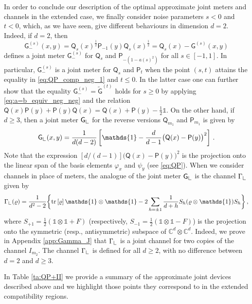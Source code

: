 \documentclass[12pt,reqno]{amsart}
\theoremstyle{definition}
\newcommand{\tr}[1]{{\rm tr}\left[#1\right]} %
\newcommand{\id}{\mathds{1}} %
\newcommand{\Qo}{\mathsf{Q}}%
\newcommand{\Po}{\mathsf{P}}%
\newcommand{\Go}{\mathsf{G}}%
\newcommand{\Lcorner}{{\mathchoice{\mathrel{\makebox[7pt][c]{\rule{.4pt}{7.5pt}\rule{5pt}{.4pt}}}}{\mathrel{\makebox[7pt][c]{\rule{.4pt}{7.5pt}\rule{5pt}{.4pt}}}}{\mathrel{\makebox[5.5pt][c]{\rule{.4pt}{5.25pt}\rule{3.5pt}{.4pt}}}}{\mathrel{\makebox[4pt][c]{\rule{.4pt}{3.75pt}\rule{2.5pt}{.4pt}}}}}}
\newcommand{\rhoo}{\varrho} %
\newcommand{\phii}{\varphi} %
\newcommand{\Cb}{\mathbb{C}} %
\begin{document}
In order to conclude our description of the optimal approximate joint meters and channels in the extended case, we finally consider noise parameters $s<0$ and $t<0$, which, as we have seen, give different behaviours in dimension $d=2$. Indeed, if $d=2$, then
\begin{equation}\label{eq:Gominus}
\Go^{(s)}_-(x,y) = \Qo_s(x)^{\frac{1}{2}}\Po_{-1}(y)\Qo_s(x)^{\frac{1}{2}} = \Qo_s(x) - \Go^{(s)}(x,y)
\end{equation}
defines a joint meter $\Go^{(s)}_-$ for $\Qo_s$ and $\Po_{-(1-a(s)^2)}$ for all $s\in [-1,1]$. In particular, $\Go^{(s)}_-$ is a joint meter for $\Qo_s$ and $\Po_t$ when the point $(s,t)$ attains the equality in \eqref{eq:QP_comp_neg_1} and $t\leq 0$. In the latter case one can further show that the equality $\Go^{(s)}_- = \tilde{\Go}^{(t)}$ holds for $s\geq 0$ by applying \eqref{eq:a=b_equiv_neg_neg} and the relation $\Qo(x)\Po(y) + \Po(y)\Qo(x) = \Qo(x) + \Po(y) - \frac{1}{2}\id$. On the other hand, if $d\geq 3$, then a joint meter $\Go_\Lcorner$ for the reverse versions $\Qo_{m_1}$ and $\Po_{m_1}$ is given by
\begin{equation}\label{eq:Gocorner}
\Go_\Lcorner(x,y) = \frac{1}{d(d-2)}\left[\id - \frac{d}{d-1}\big(\Qo(x)-\Po(y)\big)^2\right]\,.
\end{equation}
Note that the expression $[d/(d-1)]\big(\Qo(x)-\Po(y)\big)^2$ is the projection onto the linear span of the basis elements $\phii_x$ and $\psi_y$ (see \eqref{eq:QP}). When we consider channels in place of meters, the analogue of the joint meter $\Go_\Lcorner$ is the channel $\Gamma_\Lcorner$ given by
\begin{equation}\label{eq:Gammacorner}
\Gamma_\Lcorner(\rhoo) = \frac{1}{d^2-2}\bigg\{\tr{\rhoo}\id\otimes\id - 2\sum_{h=\pm 1} \frac{1}{d+h} S_h(\rhoo\otimes\id) S_h\bigg\} \,,
\end{equation}
where $S_{+1} = \frac{1}{2}(\id\otimes\id + F)$ (respectively, $S_{-1} = \frac{1}{2}(\id\otimes\id - F)$) is the projection onto the symmetric (resp., antisymmetric) subspace of $\Cb^d\otimes\Cb^d$. Indeed, we prove in Appendix \ref{app:Gamma_J} that $\Gamma_\Lcorner$ is a joint channel for two copies of the channel $I_{m_2}$.
The channel $\Gamma_\Lcorner$ is defined for all $d\geq 2$, with no difference between $d=2$ and $d\geq 3$.

In Table \ref{ta:QP+II} we provide a summary of the approximate joint devices described above and we highlight those points they correspond to in the extended compatibility regions.
\end{document}
